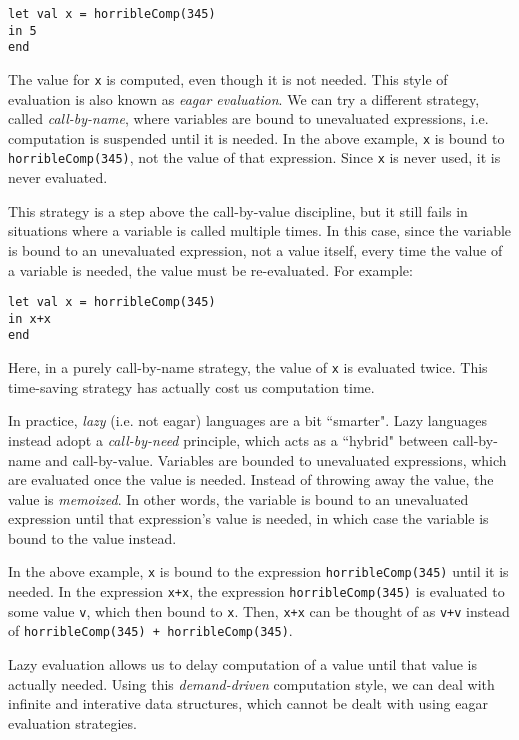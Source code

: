 \documentclass[11pt]{article}
\begin{document}
\begin{verbatim}
let val x = horribleComp(345)
in 5
end
\end{verbatim}

The value for \verb~x~ is computed, even though it is not needed. This style of evaluation is also known as \emph{eagar evaluation}. We can try a different strategy, called \emph{call-by-name}, where variables are bound to unevaluated expressions, i.e. computation is suspended until it is needed. In the above example, \verb~x~ is bound to \verb~horribleComp(345)~, not the value of that expression. Since \verb~x~ is never used, it is never evaluated. 

This strategy is a step above the call-by-value discipline, but it still fails in situations where a variable is called multiple times. In this case, since the variable is bound to an unevaluated expression, not a value itself, every time the value of a variable is needed, the value must be re-evaluated. For example:

\begin{verbatim}
let val x = horribleComp(345)
in x+x
end
\end{verbatim}

Here, in a purely call-by-name strategy, the value of  \verb~x~ is evaluated twice. This time-saving strategy has actually cost us computation time.

In practice, \emph{lazy} (i.e. not eagar) languages are a bit ``smarter". Lazy languages instead adopt a \emph{call-by-need} principle, which acts as a ``hybrid" between call-by-name and call-by-value. Variables are bounded to unevaluated expressions, which are evaluated once the value is needed. Instead of throwing away the value, the value is \emph{memoized}. In other words, the variable is bound to an unevaluated expression until that expression's value is needed, in which case the variable is bound to the value instead.

In the above example, \verb~x~ is bound to the expression \verb~horribleComp(345)~ until it is needed. In the expression \verb~x+x~, the expression \verb~horribleComp(345)~ is evaluated to some value \verb~v~, which then bound to \verb~x~. Then, \verb~x+x~ can be thought of as \verb~v+v~ instead of \verb~horribleComp(345) + horribleComp(345)~. 

Lazy evaluation allows us to delay computation of a value until that value is actually needed. Using this \emph{demand-driven} computation style, we can deal with infinite and interative data structures, which cannot be dealt with using eagar evaluation strategies. 
\end{document}
